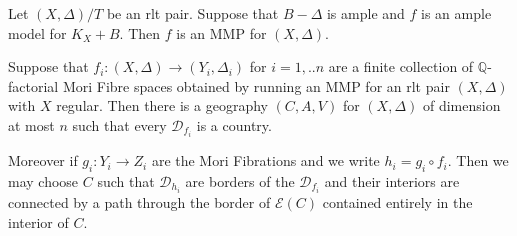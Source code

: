 \documentclass[a4paper,12pt]{amsart}
\begin{document}
	\begin{lemma}\cite[Lemma 3.6]{hacon2009sarkisov}\label{amp}
		Let $(X,\Delta)/T$ be an rlt pair. Suppose that $B-\Delta$ is ample and $f$ is an ample model for $K_{X}+B$. Then $f$ is an MMP for $(X,\Delta)$.
	\end{lemma}

\begin{lemma}\label{geo}
	Suppose that $f_{i}: (X,\Delta) \to (Y_{i},\Delta_{i})$ for $i=1,..n$ are a finite collection of $\mathbb{Q}$-factorial Mori Fibre spaces obtained by running an MMP for an rlt pair $(X,\Delta)$ with $X$ regular. Then there is a geography $(C,A,V)$ for $(X,\Delta)$ of dimension at most $n$ such that every $\mathcal{D}_{f_{i}}$ is a country. 
	
	Moreover if $g_{i}:Y_{i}\to Z_{i}$ are the Mori Fibrations and we write $h_{i}=g_{i}\circ f_{i}$. Then we may choose $C$ such that $\mathcal{D}_{h_{i}}$ are borders of the $\mathcal{D}_{f_{i}}$ and their interiors are connected by a path through the border of $\mathcal{E}(C)$ contained entirely in the interior of $C$.
\end{lemma}
\end{document}

